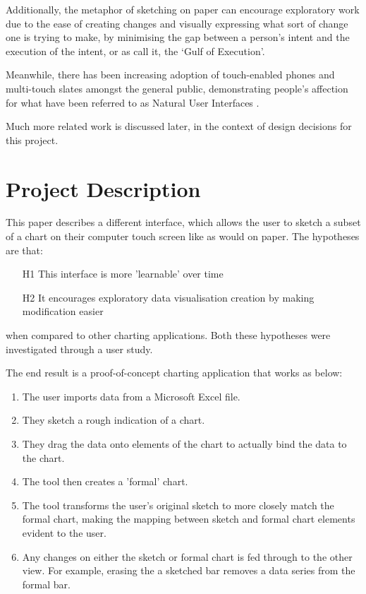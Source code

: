 
Additionally, the metaphor of sketching on paper can encourage exploratory work due to the ease of creating changes and visually expressing what sort of change one is trying to make, by minimising the gap between a person's intent and the execution of the intent, or as \cite{norman_user_1986} call it, the `Gulf of Execution'.

Meanwhile, there has been increasing adoption of touch-enabled phones and multi-touch slates amongst the general public, demonstrating people's affection for what have been referred to as Natural User Interfaces \citep{lee_beyond_2012}.

Much more related work is discussed later, in the context of design decisions for this project.

\section{Project Description}
This paper describes a different interface, which allows the user to sketch a subset of a chart on their computer touch screen like as would on paper. The hypotheses are that:

\begin{enumerate}
\item[H1] This interface is more 'learnable' over time
\item[H2] It encourages exploratory data visualisation creation by making modification easier
\end{enumerate}

when compared to other charting applications. Both these hypotheses were investigated through a user study.

The end result is a proof-of-concept charting application that works as below:
\begin{enumerate}
\item The user imports data from a Microsoft Excel file.
\item They sketch a rough indication of a chart.
\item They drag the data onto elements of the chart to actually bind the data to the chart. 
\item The tool then creates a 'formal' chart.
\item The tool transforms the user's original sketch to more closely match the formal chart, making the mapping between sketch and formal chart elements evident to the user.
\item Any changes on either the sketch or formal chart is fed through to the other view. For example, erasing the a sketched bar removes a data series from the formal bar.
\end{enumerate}

